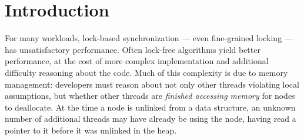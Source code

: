 \section{Introduction}



For many workloads, lock-based synchronization --- even fine-grained locking --- has unsatisfactory performance.  Often lock-free algorithms yield better performance, at the cost of more complex implementation and additional difficulty reasoning about the code.  Much of this complexity is due to memory management: 
developers must reason about not only other threads violating local assumptions, but whether other threads are \emph{finished accessing memory} for nodes to deallocate. 
At the time a node is unlinked from a data structure, an unknown number of additional threads may have already be using the node, having read a pointer to it before it was unlinked in the heap.

